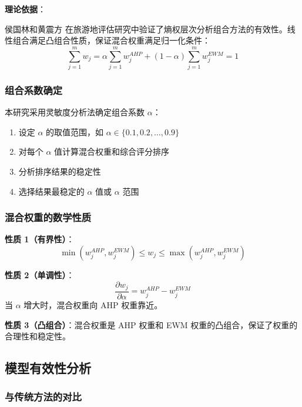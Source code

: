\textbf{理论依据}：

侯国林和黄震方\cite{hou2010lvyou} 在旅游地评估研究中验证了熵权层次分析组合方法的有效性。线性组合满足凸组合性质，保证混合权重满足归一化条件：
\begin{equation}
    \sum_{j=1}^{m} w_j = \alpha \sum_{j=1}^{m} w_j^{AHP} + (1 - \alpha) \sum_{j=1}^{m} w_j^{EWM} = 1
\end{equation}

\subsubsection{组合系数确定}

本研究采用灵敏度分析法确定组合系数 $\alpha$：

\begin{enumerate}
    \item 设定 $\alpha$ 的取值范围，如 $\alpha \in \{0.1, 0.2, \ldots, 0.9\}$
    \item 对每个 $\alpha$ 值计算混合权重和综合评分排序
    \item 分析排序结果的稳定性
    \item 选择结果最稳定的 $\alpha$ 值或 $\alpha$ 范围
\end{enumerate}

\subsubsection{混合权重的数学性质}

\textbf{性质 1（有界性）}：
\begin{equation}
    \min(w_j^{AHP}, w_j^{EWM}) \leq w_j \leq \max(w_j^{AHP}, w_j^{EWM})
\end{equation}

\textbf{性质 2（单调性）}：
\begin{equation}
    \frac{\partial w_j}{\partial \alpha} = w_j^{AHP} - w_j^{EWM}
\end{equation}
当 $\alpha$ 增大时，混合权重向 AHP 权重靠近。

\textbf{性质 3（凸组合）}：混合权重是 AHP 权重和 EWM 权重的凸组合，保证了权重的合理性和稳定性。

\subsection{模型有效性分析}
\label{subsec:validity}

\subsubsection{与传统方法的对比}


